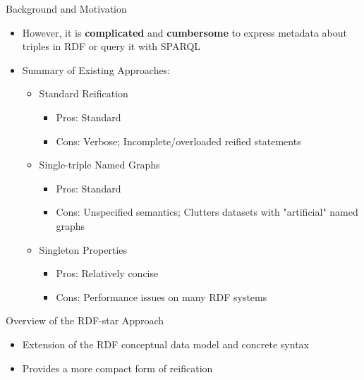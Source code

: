 \documentclass[aspectratio=169]{beamer}
\begin{document}
\begin{frame}{Background and Motivation}
    \begin{itemize}
        \item However, it is \textbf{complicated} and \textbf{cumbersome} to express metadata about triples in RDF or query it with SPARQL
        \item Summary of Existing Approaches:
        \begin{itemize}
            \item Standard Reification
                \begin{itemize}
                    \item Pros: Standard
                    \item Cons: Verbose; Incomplete/overloaded reified statements
                \end{itemize}
            \item Single-triple Named Graphs
                \begin{itemize}
                    \item Pros: Standard
                    \item Cons: Unspecified semantics; Clutters datasets with "artificial" named graphs
                \end{itemize}
            \item Singleton Properties
                \begin{itemize}
                    \item Pros: Relatively concise
                    \item Cons: Performance issues on many RDF systems
                \end{itemize}
        \end{itemize}
    \end{itemize}
\end{frame}

\begin{frame}{Overview of the RDF-star Approach}{}
    \begin{itemize}
        \item Extension of the RDF conceptual data model and concrete syntax
        \item Provides a more compact form of reification
    \end{itemize}
\end{frame}
\end{document}
